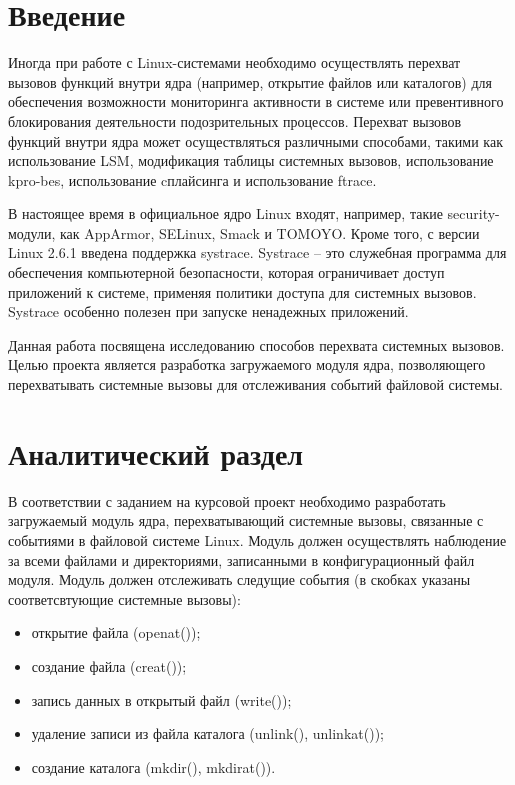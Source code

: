 \documentclass[a4paper,14pt]{article}
\begin{document}
\setcounter{page}{2}
\tableofcontents

\newpage
\section*{Введение}

Иногда при работе с Linux-системами необходимо осуществлять перехват вызовов функций внутри ядра (например, открытие файлов или каталогов) для обеспечения возможности мониторинга активности в системе или превентивного блоки­рования деятельности подозрительных процессов.
Перехват вызовов функций внутри ядра может осуществляться различными способами, такими как использование LSM, модификация таблицы системных вызовов, использование kpro-bes, использование cплайсинга и использование ftrace.

В настоящее время в официальное ядро Linux входят, например, такие security-модули, как AppArmor, SELinux, Smack и TOMOYO. Кроме того, с версии Linux 2.6.1 введена поддержка systrace. Systrace -- это служебная программа для обеспечения компьютерной безопасности, которая ограничивает доступ приложений к системе, применяя политики доступа для системных вызовов. Systrace особенно полезен при запуске ненадежных приложений.

Данная работа посвящена исследованию способов перехвата системных вызовов. Целью проекта является разработка загружаемого модуля ядра, позволяющего перехватывать системные вызовы для отслеживания событий файловой системы.


\newpage
\section{Аналитический раздел}

В соответствии с заданием на курсовой проект необходимо разработать загружаемый модуль ядра, перехватывающий системные вызовы, связанные с событиями в файловой системе Linux. Модуль должен осуществлять наблюдение за всеми файлами и директориями, записанными в конфигурационный файл модуля. Модуль должен отслеживать следущие события (в скобках указаны соответсвтующие системные вызовы):

\begin{itemize}
	\item открытие файла (openat());
	\item создание файла (creat());
	\item запись данных в открытый файл (write()); 
	\item удаление записи из файла каталога (unlink(), unlinkat());
	\item создание каталога (mkdir(), mkdirat()).
\end{itemize}
\end{document}
